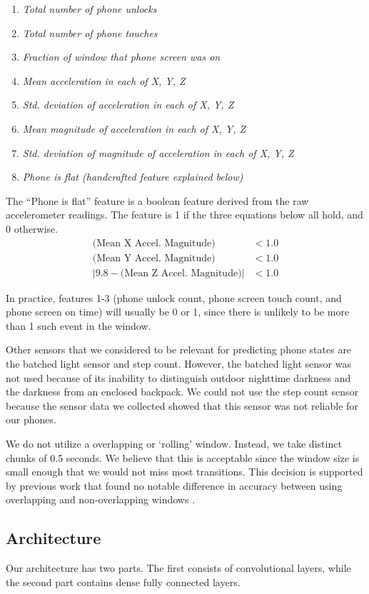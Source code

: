 \begin{enumerate}
\item \textit{Total number of phone unlocks}
\item \textit{Total number of phone touches}
\item \textit{Fraction of window that phone screen was on}
\item \textit{Mean acceleration in each of X, Y, Z}
\item \textit{Std. deviation of acceleration in each of X, Y, Z}
\item \textit{Mean magnitude of acceleration in each of X, Y, Z}
\item \textit{Std. deviation of magnitude of acceleration in each of X, Y, Z}
\item \textit{Phone is flat (handcrafted feature explained below)}
\end{enumerate}

The ``Phone is flat'' feature is a boolean feature derived from the raw accelerometer readings. 
The feature is 1 if the three equations below all hold, and 0 otherwise.
\begin{align*}
 \text{(Mean X Accel. Magnitude)} &< 1.0\\
\text{(Mean Y Accel. Magnitude)} &< 1.0\\
|9.8 - \text{(Mean Z Accel. Magnitude)}| &< 1.0
\end{align*}

In practice, features 1-3 (phone unlock count, phone screen touch count, and phone screen on time) will usually be 0 or 1, since there is unlikely
to be more than 1 such event in the window.

Other sensors that we considered to be relevant for predicting phone states are the batched light sensor and step count.
However, the batched light sensor was not used because of its inability to distinguish outdoor nighttime darkness and the darkness from an enclosed backpack. 
We could not use the step count sensor because the sensor data we collected showed that this sensor was not reliable for our phones. 

We do not utilize a overlapping or `rolling' window.  Instead, we take distinct chunks of 0.5 seconds.
We believe that this is acceptable since the window size is small enough that we would not miss most transitions.
This decision is supported by previous work that found no notable difference in accuracy between using overlapping and non-overlapping windows \cite{Martin2013}.

\subsection{Architecture}
Our architecture has two parts.
The first consists of convolutional layers, while the second part contains dense fully connected layers.


